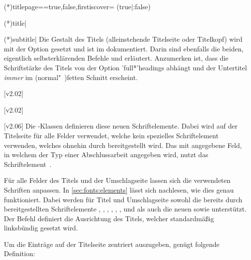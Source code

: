 \begin{DeclareEntity*}{}
\begin{DeclareEntity*}{}
\begin{DeclareEntity*}{}
\begin{Declaration}
  {\Option(*){titlepage=\PMisc}}=true,false,firstiscover=
  (true|:false)
\begin{Declaration}
  {\Macro(*){title|}}
\begin{Declaration}
  {\Macro(*){subtitle|}}
Die Gestalt des Titels (alleinstehende Titelseite oder Titelkopf) wird mit der 
Option  gesetzt und ist im \scrguide dokumentiert. Darin sind 
ebenfalls die beiden, eigentlich selbsterklärenden Befehle  und 
 erläutert. Anzumerken ist, dass die Schriftstärke des Titels 
von der Option \Option'full*'{headings} abhängt und der Untertitel \emph{immer} 
im (normal"~)fetten Schnitt erscheint. 

\end{Declaration}
\end{Declaration}
\end{Declaration}

\begin{Declaration}
  {}
  [v2.02]
\begin{Declaration}
  {}
  [v2.02]
\begin{Declaration}
  {}
  [v2.06]
%
Die \TUDScript-Klassen definieren diese neuen Schriftelemente. Dabei wird 
 auf der Titelseite für alle Felder verwendet, welche kein 
spezielles Schriftelement verwenden, welches ohnehin durch \KOMAScript 
bereitgestellt wird. Das mit  angegebene Feld, in welchem der Typ 
einer Abschlussarbeit angegeben wird, nutzt das Schriftelement~. 

%
Für alle Felder des Titels und der Umschlagseite lassen sich die verwendeten
Schriften anpassen. In \autoref{sec:fonts:elements} lässt sich nachlesen, wie 
dies genau funktioniert. Dabei werden für Titel und Umschlagseite sowohl die 
bereits durch \KOMAScript bereitgestellten Schriftelemente , 
, , , , , 
 und  als auch die neuen  
sowie  unterstützt.
%
Der Befehl  definiert die Ausrichtung des Titels, welcher 
standardmäßig linksbündig gesetzt wird.
\begin{Example}
Um die Einträge auf der Titelseite zentriert auszugeben, genügt folgende 
Definition:
\begin{Code}
\let\raggedtitle\centering
\end{Code}
\end{Example}
\end{Declaration}
\end{Declaration}
\end{Declaration}


\end{DeclareEntity*}
\end{DeclareEntity*}
\end{DeclareEntity*}
